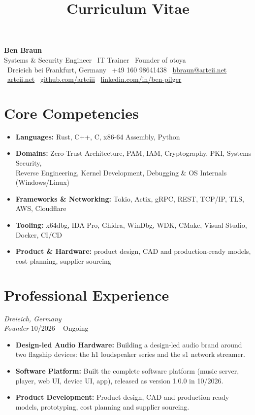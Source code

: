 \documentclass[10pt,a4paper]{article}
\title{Curriculum Vitae}
\newcommand{\experienceitem}[4]{
  \vspace{12pt}
  \noindent{\large\textbf{\color{sectioncolor}#1}} \hfill \textit{#2} \\
  \noindent\textit{#3} \hfill #4 \par %
  \vspace{2pt}
}
\begin{document}
\begin{center}
    {\Huge \textbf{\color{primary} Ben Braun}} \\
    \vspace{4pt}
    {\large Systems \& Security Engineer \textbar\ IT Trainer \textbar\ Founder of otoya} \\
    \vspace{6pt}
    \small
    \faMapMarker* \ Dreieich bei Frankfurt, Germany \quad
    \faPhone \ +49 160 98641438 \quad
    \faEnvelope \ \href{mailto:bbraun@arteii.net}{bbraun@arteii.net} \\ \vspace{3pt}
    \faGlobe \ \href{https://arteii.net}{arteii.net} \quad
    \faGithub \ \href{https://github.com/arteiii}{github.com/arteiii} \quad
    \faLinkedin \ \href{https://linkedin.com/in/ben-pilger}{linkedin.com/in/ben-pilger}
\end{center}

\vspace{0.2em}

\section{Core Competencies}
\begin{itemize}[leftmargin=0pt, listparindent=0pt, label={}]
    \item \textbf{Languages:} Rust, C++, C, x86-64 Assembly, Python
    \item \textbf{Domains:} Zero-Trust Architecture, PAM, IAM, Cryptography, PKI, Systems Security, \\ Reverse Engineering, Kernel Development, Debugging \& OS Internals (Windows/Linux)
    \item \textbf{Frameworks \& Networking:} Tokio, Actix, gRPC, REST, TCP/IP, TLS, AWS, Cloudflare
    \item \textbf{Tooling:} x64dbg, IDA Pro, Ghidra, WinDbg, WDK, CMake, Visual Studio, Docker, CI/CD
    \item \textbf{Product \& Hardware:} product design, CAD and production-ready models, cost planning, supplier sourcing
\end{itemize}

\section{Professional Experience}

\experienceitem{otoya}{Dreieich, Germany}{Founder}{10/2026 -- Ongoing}
\begin{itemize}[leftmargin=1.5em, nosep]
    \item \textbf{Design-led Audio Hardware:} Building a design-led audio brand around two flagship devices: the h1 loudspeaker series and the s1 network streamer.
    \item \textbf{Software Platform:} Built the complete software platform (music server, player, web UI, device UI, app), released as version 1.0.0 in 10/2026.
    \item \textbf{Product Development:} Product design, CAD and production-ready models, prototyping, cost planning and supplier sourcing.
\end{itemize}
\end{document}
